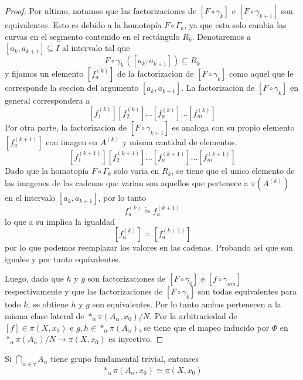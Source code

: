 \begin{proof}
  Por ultimo, notamos que las factorizaciones de \([F \circ \gamma_k]\) e
  \([F \circ \gamma_{k+1}]\) son equivalentes. Esto es debido a la
  homotopía \(F \circ \Gamma_k\), ya que esta solo cambia las curvas en el
  segmento contenido en el rectángulo \(R_k\). Denotaremos a \([a_k,
  a_{k+1}] \subseteq I\) al intervalo tal que
  \[F \circ \gamma_k \, ([a_k , a_{k+1}]) \subseteq R_k\]
  y fijamos un elemento \([f_a^{(k)}]\) de la factorizacion de \([F
  \circ \gamma_k]\) como aquel que le corresponde la seccion del argumento
  \([a_k , a_{k+1}]\). La factorizacion de \([F \circ \gamma_k]\) en
  general correspondera a
  \[ [f_1^{(k)}] [f_2^{(k)}] ... [f_a^{(k)}] ... [f_m^{(k)}] \]
  Por otra parte, la factorizacion de \([F \circ \gamma_{k+1}]\) es
  analoga con su propio elemento \([f_a^{(k+1)}]\) con imagen en
  \(A^{(k)}\) y misma cantidad de elementos.
  \[ [f_1^{(k+1)}] [f_2^{(k+1)}] ... [f_a^{(k+1)}] ... [f_m^{(k+1)}] \]
  Dado que la homotopía \(F \circ \Gamma_k\) solo varia en \(R_k\), se
  tiene que el unico elemento de las imagenes de las cadenas que varian
  son aquellos que pertenece a \(\pi (A^{(k)})\) en el intervalo \([a_k,
  a_{k+1}]\), por lo tanto
  \[ f_a^{(k)} \dot \simeq f_a^{(k+1)} \]
  lo que a su implica la igualdad
  \[ [f_a^{(k)}] = [f_a^{(k+1)}]\]
  por lo que podemos reemplazar los valores en las cadenas. Probando asi
  que son iguales y por tanto equivalentes.

  Luego, dado que \(h\) y \(g\) son factorizaciones de \([F \circ
  \gamma_0]\) e \([f \circ \gamma_{nm}]\) respectivamente y que las
  factorizaciones de \([F \circ \gamma_k]\) son todas equivalentes para
  todo \(k\), se obtiene \(h\) y \(g\) son equivalentes. Por lo tanto
  ambas pertenecen a la misma clase lateral de \(*_\alpha \pi (A_\alpha ,
  x_0) / N\). Por la arbitrariedad de \([f] \in \pi (X, x_0)\) e \(g,h \in
  *_\alpha \pi (A_\alpha)\), se tiene que el mapeo inducido por \(\Phi\)
  en \(*_\alpha \pi (A_\alpha) / N \to \pi (X,x_0)\) es inyectivo.
\end{proof}
\begin{corolario} \label{cor:vank-trivial}
  Si \(\bigcap_{\alpha \in \tau} A_\alpha \) tiene grupo fundamental
  trivial, entonces
  \[ *_\alpha \pi (A_\alpha , x_0) \simeq \pi (X, x_0) \]
\end{corolario}

